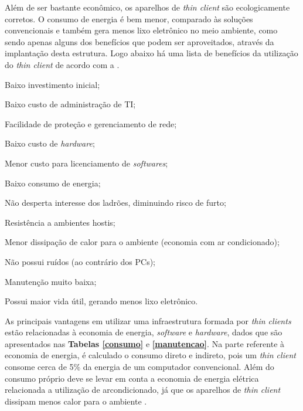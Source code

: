 \documentclass[
	12pt,				%
	openright,			%
	twoside,			%
	a4paper,			%
	chapter=TITLE,		%
	english,			%
	brazil				%
	]{abntex2}
\begin{document}
Além de ser bastante econômico, os aparelhos de \textit{thin client} são ecologicamente corretos. O consumo de energia é bem menor, comparado às soluções convencionais e também gera menos lixo eletrônico no meio ambiente, como sendo apenas alguns dos benefícios que podem ser aproveitados, através da implantação desta estrutura. Logo abaixo há uma lista de benefícios da utilização do \textit{thin client} de acordo com a .

\begin{alineas}
\item Baixo investimento inicial;
\item Baixo custo de administração de TI;
\item Facilidade de proteção e gerenciamento de rede;
\item Baixo custo de \textit{hardware};
\item Menor custo para licenciamento de \textit{softwares};
\item Baixo consumo de energia;
\item Não desperta interesse dos ladrões, diminuindo risco de furto;
\item Resistência a ambientes hostis;
\item Menor dissipação de calor para o ambiente (economia com ar condicionado);
\item Não possui ruídos (ao contrário dos PCs);
\item Manutenção muito baixa;
\item Possui maior vida útil, gerando menos lixo eletrônico.
\end{alineas}

As principais vantagens em utilizar uma infraestrutura formada por \textit{thin clients} estão relacionadas à economia de energia, \textit{software} e \textit{hardware}, dados que são apresentados nas \textbf{Tabelas \ref{consumo}} e \textbf{\ref{manutencao}}. Na parte referente à economia de energia, é calculado o consumo direto e indireto, pois um \textit{thin client} consome cerca de 5\% da energia de um computador convencional. Além do consumo próprio deve se levar em conta a economia de energia elétrica relacionada a utilização de ar\-condicionado, já que os aparelhos de \textit{thin client} dissipam menos calor para o ambiente \cite{EmailThinClient}.
	 
\end{document}
